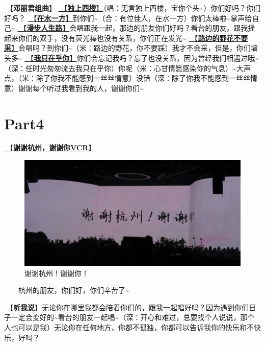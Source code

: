 \documentclass[]{ctexbook}
\begin{document}
🎵【\textbf{邓丽君组曲}】
\hyperref[one-in-the-building]{🎵【\textbf{独上西楼}】}（唱：无言独上西楼，宝你个头\textasciitilde）你们好吗？你们好吗？
\hyperref[on-the-water-side]{🎵【\textbf{在水一方}】}到你们\textasciitilde（合：有位佳人，在水一方）你们太棒啦\textasciitilde 掌声给自己\textasciitilde{}
\hyperref[walk-the-road-of-life]{🎵【\textbf{漫步人生路}】}会唱跟我一起，那边的朋友你们好吗？看台的朋友，跟我摇起来你们的双手，没有荧光棒也没有关系，你们正在发光\textasciitilde{}
\hyperref[only-with-me]{🎵【\textbf{路边的野花不要采}】}会唱吗？到你们\textasciitilde（米：路边的野花，你不要踩）我才不会采，但是，你们墙头多\textasciitilde{}
\hyperref[only-you]{🎵【\textbf{我只在乎你}】}你们会忘记我吗？忘了也没关系，因为曾经我们相遇过哦\textasciitilde（深：任时光匆匆流去我只在乎你）你呢（米：心甘情愿感染你的气息）\textasciitilde 大声点，（米：除了你我不能感到一丝丝情意）没错（深：除了你我不能感到一丝丝情意）谢谢每个听过我看到我的人，谢谢你们\textasciitilde{}

\section{Part4}\label{hangzhou-20240824-part4}

\hyperref[thank-you-vcr]{🎥【\textbf{谢谢杭州，谢谢你VCR}】}

\begin{figure}

{\centering \includegraphics[width=350pt]{img/hangzhou20240824/thank-hangzhou} 

}

\caption{谢谢杭州！谢谢你！}\label{fig:unnamed-chunk-87}
\end{figure}

  杭州的朋友，你们好，你们辛苦了\textasciitilde{}

\hyperref[listen-to-me]{🎵【\textbf{听我说}】}无论你在哪里我都会陪着你们的，跟我一起唱好吗？因为遇到你们日子一定会变好的\textasciitilde 看台的朋友一起唱\textasciitilde（深：开心和难过，总要找个人说说，那个人也可以是我）无论你在任何地方，你都不孤独，你都可以告诉我你的快乐和不快乐，好吗？
\end{document}

